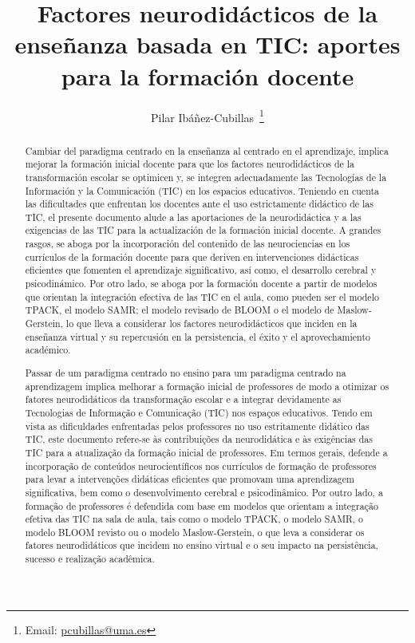 \documentclass[spanish]{textolivre}
\title{Factores neurodidácticos de la enseñanza basada en TIC: aportes para la formación docente}
\author[1]{Pilar Ibáñez-Cubillas~\orcid{0000-0001-7117-5746}\thanks{Email: \href{mailto:pcubillas@uma.es}{pcubillas@uma.es}}}
\affil[1]{Universidad de Málaga, Facultad de Ciencias de la Educación, Departamento de Didáctica y Organización Escolar, Málaga, España.}
\begin{document}
\maketitle

\begin{polyabstract}
\begin{abstract}
Cambiar del paradigma centrado en la enseñanza al centrado en el aprendizaje, implica mejorar la formación inicial docente para que los factores neurodidácticos de la transformación escolar se optimicen y, se integren adecuadamente las Tecnologías de la Información y la Comunicación (TIC) en los espacios educativos. Teniendo en cuenta las dificultades que enfrentan los docentes ante el uso estrictamente didáctico de las TIC, el presente documento alude a las aportaciones de la neurodidáctica y a las exigencias de las TIC para la actualización de la formación inicial docente. A grandes rasgos, se aboga por la incorporación del contenido de las neurociencias en los currículos de la formación docente para que deriven en intervenciones didácticas eficientes que fomenten el aprendizaje significativo, así como, el desarrollo cerebral y psicodinámico. Por otro lado, se aboga por la formación docente a partir de modelos que orientan la integración efectiva de las TIC en el aula, como pueden ser el modelo TPACK, el modelo SAMR; el modelo revisado de BLOOM o el modelo de Maslow-Gerstein, lo que lleva a considerar los factores neurodidácticos que inciden en la enseñanza virtual y su repercusión en la persistencia, el éxito y el aprovechamiento académico.

\end{abstract}

\begin{portuguese}
\begin{abstract}
Passar de um paradigma centrado no ensino para um paradigma centrado na aprendizagem implica melhorar a formação inicial de professores de modo a otimizar os fatores neurodidáticos da transformação escolar e a integrar devidamente as Tecnologias de Informação e Comunicação (TIC) nos espaços educativos. Tendo em vista as dificuldades enfrentadas pelos professores no uso estritamente didático das TIC, este documento refere-se às contribuições da neurodidática e às exigências das TIC para a atualização da formação inicial de professores. Em termos gerais, defende a incorporação de conteúdos neurocientíficos nos currículos de formação de professores para levar a intervenções didáticas eficientes que promovam uma aprendizagem significativa, bem como o desenvolvimento cerebral e psicodinâmico. Por outro lado, a formação de professores é defendida com base em modelos que orientam a integração efetiva das TIC na sala de aula, tais como o modelo TPACK, o modelo SAMR, o modelo BLOOM revisto ou o modelo Maslow-Gerstein, o que leva a considerar os fatores neurodidáticos que incidem no ensino virtual e o seu impacto na persistência, sucesso e realização acadêmica.


\end{abstract}
\end{portuguese}
\end{polyabstract}
\end{document}
